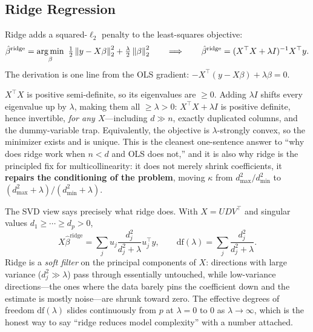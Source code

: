 \subsection{Ridge Regression}

Ridge adds a squared-$\ell_2$ penalty to the least-squares objective:
\begin{equation}
\hat\beta^{\text{ridge}} = \argmin_\beta \ \tfrac{1}{2}\norm{y - X\beta}_2^2 + \tfrac{\lambda}{2}\norm{\beta}_2^2
\qquad\Longrightarrow\qquad
\hat\beta^{\text{ridge}} = (X^{\top}X + \lambda I)^{-1}X^{\top}y .
\end{equation}
The derivation is one line from the OLS gradient: $-X^{\top}(y - X\beta) + \lambda\beta = 0$.

\begin{keyinsight}
$X^{\top}X$ is positive semi-definite, so its eigenvalues are $\ge 0$. Adding $\lambda I$ shifts every eigenvalue up by $\lambda$, making them all $\ge \lambda > 0$: $X^{\top}X + \lambda I$ is positive definite, hence invertible, \emph{for any $X$}---including $d \gg n$, exactly duplicated columns, and the dummy-variable trap. Equivalently, the objective is $\lambda$-strongly convex, so the minimizer exists and is unique. This is the cleanest one-sentence answer to ``why does ridge work when $n < d$ and OLS does not,'' and it is also why ridge is the principled fix for multicollinearity: it does not merely shrink coefficients, it \textbf{repairs the conditioning of the problem}, moving $\kappa$ from $d_{\max}^2/d_{\min}^2$ to $(d_{\max}^2+\lambda)/(d_{\min}^2+\lambda)$.
\end{keyinsight}

The SVD view says precisely what ridge does. With $X = UDV^{\top}$ and singular values $d_1 \ge \cdots \ge d_p > 0$,
\begin{equation}
X\hat\beta^{\text{ridge}} = \sum_{j} u_j \frac{d_j^2}{d_j^2 + \lambda} u_j^{\top} y ,
\qquad
\mathrm{df}(\lambda) = \sum_j \frac{d_j^2}{d_j^2+\lambda} .
\end{equation}
Ridge is a \emph{soft filter} on the principal components of $X$: directions with large variance ($d_j^2 \gg \lambda$) pass through essentially untouched, while low-variance directions---the ones where the data barely pins the coefficient down and the estimate is mostly noise---are shrunk toward zero. The effective degrees of freedom $\mathrm{df}(\lambda)$ slides continuously from $p$ at $\lambda=0$ to $0$ as $\lambda\to\infty$, which is the honest way to say ``ridge reduces model complexity'' with a number attached.

